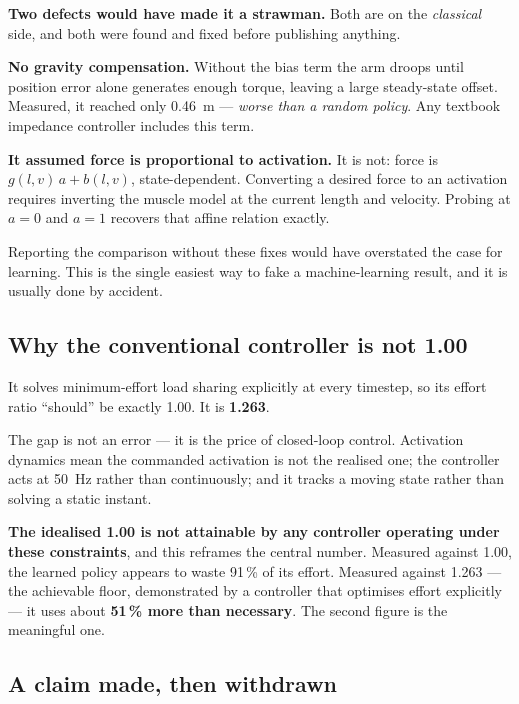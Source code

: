 \begin{trap}
\textbf{Two defects would have made it a strawman.} Both are on the
\emph{classical} side, and both were found and fixed before publishing anything.

\textbf{No gravity compensation.} Without the bias term the arm droops until
position error alone generates enough torque, leaving a large steady-state
offset. Measured, it reached only \SI{0.46}{\meter} --- \emph{worse than a random
policy}. Any textbook impedance controller includes this term.

\textbf{It assumed force is proportional to activation.} It is not: force is
$g(l,v)\,a + b(l,v)$, state-dependent. Converting a desired force to an
activation requires inverting the muscle model at the current length and velocity.
Probing at $a = 0$ and $a = 1$ recovers that affine relation exactly.

Reporting the comparison without these fixes would have overstated the case for
learning. This is the single easiest way to fake a machine-learning result, and
it is usually done by accident.
\end{trap}

\subsection{Why the conventional controller is not 1.00}

It solves minimum-effort load sharing explicitly at every timestep, so its effort
ratio ``should'' be exactly 1.00. It is \textbf{1.263}.

\begin{why}
The gap is not an error --- it is the price of closed-loop control. Activation
dynamics mean the commanded activation is not the realised one; the controller
acts at \SI{50}{\hertz} rather than continuously; and it tracks a moving state
rather than solving a static instant.

\textbf{The idealised 1.00 is not attainable by any controller operating under
these constraints}, and this reframes the central number. Measured against 1.00,
the learned policy appears to waste 91\,\% of its effort. Measured against 1.263 ---
the achievable floor, demonstrated by a controller that optimises effort
explicitly --- it uses about \textbf{51\,\% more than necessary}. The second figure
is the meaningful one.
\end{why}

\subsection{A claim made, then withdrawn}

